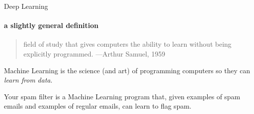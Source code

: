 \documentclass{beamer}
\begin{document}
    \begin{frame}[t]{Deep Learning}
      \framesubtitle{a slightly general definition}%
      \begin{quote}
        field of study that gives computers the ability to learn without being explicitly programmed.
        \hfill {\tiny —Arthur Samuel, 1959}
      \end{quote}
      Machine Learning is the science (and art) of programming computers so they can \textit{learn from data}. \\
      \vspace{8mm}
      \parbox{0.55\textwidth}{
      Your spam filter is a Machine Learning program that, given examples of spam emails and examples of regular emails, can learn to flag spam.
      }
    \end{frame}
\end{document}
